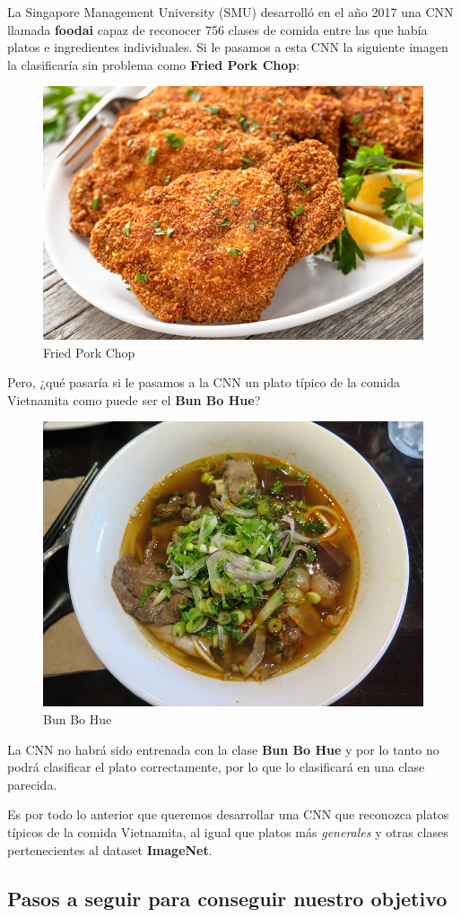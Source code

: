 \vspace{3 mm}

La Singapore Management University (SMU) desarrolló en el año 2017 una CNN llamada \textbf{foodai} capaz de reconocer 756 clases de comida entre las que había platos e ingredientes individuales. Si le pasamos a esta CNN la siguiente imagen la clasificaría sin problema como \textbf{Fried Pork Chop}:

\vspace{5 mm}

\begin{figure}[H]
  \centering
  \includegraphics[width=0.5\linewidth]{Imagenes/empanada.jpeg}  
  \caption{Fried Pork Chop}
  \label{fig:sub-first}
\end{figure}

\newpage

Pero, ¿qué pasaría si le pasamos a la CNN un plato típico de la comida Vietnamita como puede ser el \textbf{Bun Bo Hue}?

\vspace{5 mm}

\begin{figure}[H]
  \centering
  \includegraphics[width=0.5\linewidth]{Imagenes/bunbohue.jpeg}  
  \caption{Bun Bo Hue}
  \label{fig:sub-first}
\end{figure}

\vspace{5 mm}

La CNN no habrá sido entrenada con la clase \textbf{Bun Bo Hue} y por lo tanto no podrá clasificar el plato correctamente, por lo que lo clasificará en una clase parecida.

\vspace{3 mm}

Es por todo lo anterior que queremos desarrollar una CNN que reconozca platos típicos de la comida Vietnamita, al igual que platos más \textit{generales} y otras clases pertenecientes al dataset \textbf{ImageNet}.


\subsection{Pasos a seguir para conseguir nuestro objetivo}
